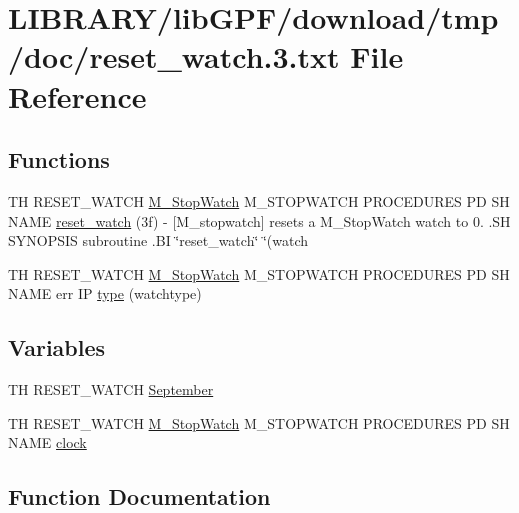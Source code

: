 \hypertarget{reset__watch_83_8txt}{}\section{L\+I\+B\+R\+A\+R\+Y/lib\+G\+P\+F/download/tmp/doc/reset\+\_\+watch.3.txt File Reference}
\label{reset__watch_83_8txt}
\subsection*{Functions}
\begin{DoxyCompactItemize}
\item 
TH R\+E\+S\+E\+T\+\_\+\+W\+A\+T\+CH \hyperlink{option__stopwatch_83_8txt_aa2011fc45a5e502e87ee50996a8a9305}{M\+\_\+\+Stop\+Watch} M\+\_\+\+S\+T\+O\+P\+W\+A\+T\+CH P\+R\+O\+C\+E\+D\+U\+R\+ES PD SH N\+A\+ME \hyperlink{reset__watch_83_8txt_a8979fe90312513c8e2e928e5b426d683}{reset\+\_\+watch} (3f) -\/ \mbox{[}\+M\+\_\+stopwatch\mbox{]} resets a M\+\_\+\+Stop\+Watch watch to 0. .\+S\+H S\+Y\+N\+O\+P\+S\+I\+S subroutine .\+B\+I \char`\"{}reset\+\_\+watch\char`\"{} \char`\"{}(watch
\item 
TH R\+E\+S\+E\+T\+\_\+\+W\+A\+T\+CH \hyperlink{option__stopwatch_83_8txt_aa2011fc45a5e502e87ee50996a8a9305}{M\+\_\+\+Stop\+Watch} M\+\_\+\+S\+T\+O\+P\+W\+A\+T\+CH P\+R\+O\+C\+E\+D\+U\+R\+ES PD SH N\+A\+ME err IP \hyperlink{reset__watch_83_8txt_a69ae41268dbeb10a64f113e549021710}{type} (watchtype)
\end{DoxyCompactItemize}
\subsection*{Variables}
\begin{DoxyCompactItemize}
\item 
TH R\+E\+S\+E\+T\+\_\+\+W\+A\+T\+CH \hyperlink{reset__watch_83_8txt_a75ad10929d982abab45eddd5a9ee9490}{September}
\item 
TH R\+E\+S\+E\+T\+\_\+\+W\+A\+T\+CH \hyperlink{option__stopwatch_83_8txt_aa2011fc45a5e502e87ee50996a8a9305}{M\+\_\+\+Stop\+Watch} M\+\_\+\+S\+T\+O\+P\+W\+A\+T\+CH P\+R\+O\+C\+E\+D\+U\+R\+ES PD SH N\+A\+ME \hyperlink{reset__watch_83_8txt_a6edaf77670f85062a402406bd5a409b1}{clock}
\end{DoxyCompactItemize}


\subsection{Function Documentation}
\mbox{\label{reset__watch_83_8txt_a8979fe90312513c8e2e928e5b426d683}} 
